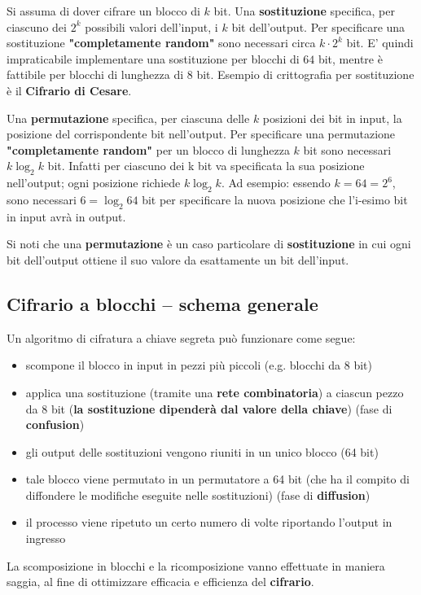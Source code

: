 Si assuma di dover cifrare un blocco di $k$ bit. Una \textbf{sostituzione} specifica, per ciascuno dei $2^k$ possibili valori dell'input, i $k$ bit dell'output. Per specificare una sostituzione \textbf{"completamente random"} sono necessari circa $k \cdot 2^k$ bit. E' quindi impraticabile implementare una sostituzione per blocchi di $64$ bit, mentre è fattibile per blocchi di lunghezza di $8$ bit. Esempio di crittografia per sostituzione è il \textbf{Cifrario di Cesare}.\newline 

Una \textbf{permutazione} specifica, per ciascuna delle $k$ posizioni dei bit in input, la posizione del corrispondente bit nell'output. Per specificare una permutazione \textbf{"completamente random"} per un blocco di lunghezza $k$ bit sono necessari $k\log_2 k$ bit. Infatti per ciascuno dei k bit va specificata la sua posizione nell'output; ogni posizione richiede $k\log_2 k$. Ad esempio: essendo $k = 64 = 2^6$, sono necessari $6 = \log_2 {64}$ bit per specificare la nuova posizione che l'i-esimo bit in input avrà in output. \newline

Si noti che una \textbf{permutazione} è un caso particolare di \textbf{sostituzione} in cui ogni bit dell'output ottiene il suo valore da esattamente un bit dell'input.

\subsection{Cifrario a blocchi – schema generale}
Un algoritmo di cifratura a chiave segreta può funzionare come segue:
\begin{itemize}
  \item scompone il blocco in input in pezzi più piccoli (e.g. blocchi da 8 bit)
  \item applica una sostituzione (tramite una \textbf{rete combinatoria}) a ciascun pezzo da 8 bit (\textbf{la sostituzione dipenderà dal valore della chiave}) (fase di \textbf{confusion})
  \item gli output delle sostituzioni vengono riuniti in un unico blocco (64 bit)
  \item tale blocco viene permutato in un permutatore a 64 bit (che ha il compito di diffondere le modifiche eseguite nelle sostituzioni) (fase di \textbf{diffusion})
  \item il processo viene ripetuto un certo numero di volte riportando l'output in ingresso
\end{itemize}
La scomposizione in blocchi e la ricomposizione vanno effettuate in maniera saggia, al fine di ottimizzare efficacia e efficienza del \textbf{cifrario}.

